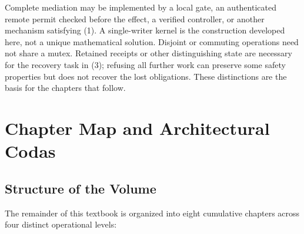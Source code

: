 \documentclass[11pt,a4paper]{article}
\begin{document}
Complete mediation may be implemented by a local gate, an authenticated remote permit checked before the effect, a verified controller, or another mechanism satisfying (1). A single-writer kernel is the construction developed here, not a unique mathematical solution. Disjoint or commuting operations need not share a mutex. Retained receipts or other distinguishing state are necessary for the recovery task in (3); refusing all further work can preserve some safety properties but does not recover the lost obligations. These distinctions are the basis for the chapters that follow.

\section{Chapter Map and Architectural Codas}\label{sec:prereq-map}

\subsection{Structure of the Volume}

The remainder of this textbook is organized into eight cumulative chapters across four distinct operational levels:
\end{document}

